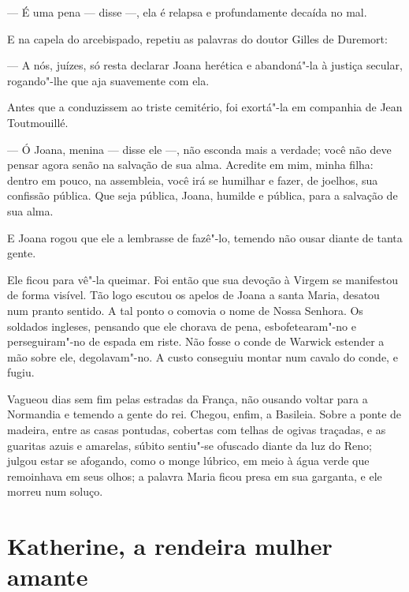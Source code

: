 --- É uma pena --- disse ---, ela é relapsa e profundamente decaída no mal.

E na capela do arcebispado, repetiu as palavras do doutor Gilles de
Duremort:

--- A nós, juízes, só resta declarar Joana herética e abandoná"-la à justiça
secular, rogando"-lhe que aja suavemente com ela.

Antes que a conduzissem ao triste cemitério, foi exortá"-la em companhia de
Jean Toutmouillé.

--- Ó Joana, menina --- disse ele ---, não esconda mais a verdade; você não deve
pensar agora senão na salvação de sua alma. Acredite em mim, minha filha:
dentro em pouco, na assembleia, você irá se humilhar e fazer, de joelhos,
sua confissão pública. Que seja pública, Joana, humilde e pública, para a
salvação de sua alma.

E Joana rogou que ele a lembrasse de fazê"-lo, temendo não ousar diante de
tanta gente.

Ele ficou para vê"-la queimar. Foi então que sua devoção à Virgem se
manifestou de forma visível. Tão logo escutou os apelos de Joana a santa
Maria, desatou num pranto sentido. A tal ponto o comovia o nome de Nossa
Senhora. Os soldados ingleses, pensando que ele chorava de pena,
esbofetearam"-no e perseguiram"-no de espada em riste. Não fosse o conde de
Warwick estender a mão sobre ele, degolavam"-no. A custo conseguiu montar
num cavalo do conde, e fugiu.

Vagueou dias sem fim pelas estradas da França, não ousando voltar para a
Normandia e temendo a gente do rei. Chegou, enfim, a Basileia. Sobre a
ponte de madeira, entre as casas pontudas, cobertas com telhas de ogivas
traçadas, e as guaritas azuis e amarelas, súbito sentiu"-se ofuscado diante
da luz do Reno; julgou estar se afogando, como o monge lúbrico, em meio à
água verde que remoinhava em seus olhos; a palavra Maria ficou presa em
sua garganta, e ele morreu num soluço.

\chapter{Katherine, a rendeira mulher amante}

